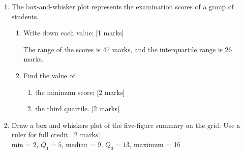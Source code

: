 \documentclass[12pt, twoside]{article}
\begin{document}
\begin{enumerate}
\item The box-and-whisker plot represents the examination scores of a group of students.
  \begin{center}
  \end{center}
  \begin{enumerate}
    \item Write down each value: \hfill [1 marks]
    \begin{enumerate}
    \end{enumerate} \vspace{0.5cm}
    The range of the scores is 47 marks, and the interquartile range is 26 marks. \vspace{0.5cm}
    \item Find the value of
    \begin{enumerate}
      \item the minimum score; \hfill [2 marks] \vspace{1cm}
      \item the third quartile. \hfill [2 marks]
    \end{enumerate}
  \end{enumerate}

\newpage
\item Draw a box and whiskers plot of the five-figure summary on the grid. Use a ruler for full credit. \hfill [2 marks] \vspace{0.25cm}\\
min = 2, $Q_1=5$, median = 9, $Q_3=13$, maximum = 16


\end{enumerate}
\end{document}

